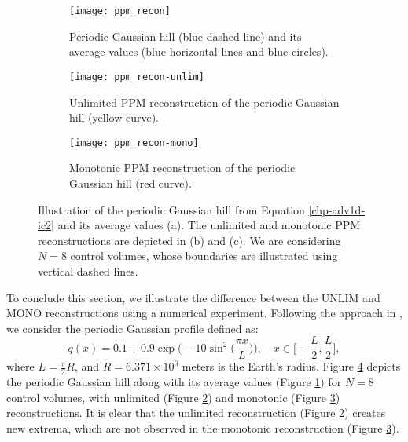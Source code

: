 \begin{figure}[!htb]
	\centering
	\begin{subfigure}{0.4\textwidth}
		\centering
		\texttt{[image: ppm\_recon]}
		\caption{Periodic Gaussian  hill (blue dashed line) and its average values (blue horizontal lines and blue circles). \label{recon-ppm-fig-av}}
	\end{subfigure}

	\begin{subfigure}{0.4\textwidth}
		\centering
		\texttt{[image: ppm\_recon-unlim]}
		\caption{Unlimited PPM reconstruction of the periodic Gaussian  hill (yellow curve).\label{recon-ppm-fig-unlim}}
	\end{subfigure}
	\begin{subfigure}{0.4\textwidth}
		\centering
		\texttt{[image: ppm\_recon-mono]}
		\caption{Monotonic PPM reconstruction of the periodic Gaussian  hill (red curve).\label{recon-ppm-fig-mono}}
	\end{subfigure}
	\caption{
    Illustration of the periodic Gaussian  hill from Equation \eqref{chp-adv1d-ic2} and its average values (a). The unlimited and monotonic PPM reconstructions are depicted in (b) and (c). We are considering $N=8$ control volumes, whose boundaries are illustrated using vertical dashed lines.\label{recon-ppm-fig}}
\end{figure}

To conclude this section, we illustrate the difference between the UNLIM and MONO reconstructions using a numerical experiment. 
Following the approach in \citet{trefethen:2000}, we consider the periodic Gaussian profile defined as:
\begin{equation}
	\label{chp-adv1d-ic2}
	q(x) = 0.1 + 0.9\exp\bigg(-10\sin^2{\bigg(\frac{\pi x}{L}\bigg)}\bigg),\quad x \in \bigg[-\frac{L}{2},\frac{L}{2}\bigg],
\end{equation}
where $L = \frac{\pi}{2} R$, and $R = 6.371 \times 10^{6}$ meters is the Earth's radius.
Figure \ref{recon-ppm-fig} depicts the periodic Gaussian hill along with its average values (Figure \ref{recon-ppm-fig-av}) for $N=8$ control volumes,
with unlimited (Figure \ref{recon-ppm-fig-unlim}) and monotonic (Figure \ref{recon-ppm-fig-mono}) reconstructions. 
It is clear that the unlimited reconstruction (Figure \ref{recon-ppm-fig-unlim}) creates new extrema, which are not observed in the monotonic reconstruction (Figure \ref{recon-ppm-fig-mono}).

